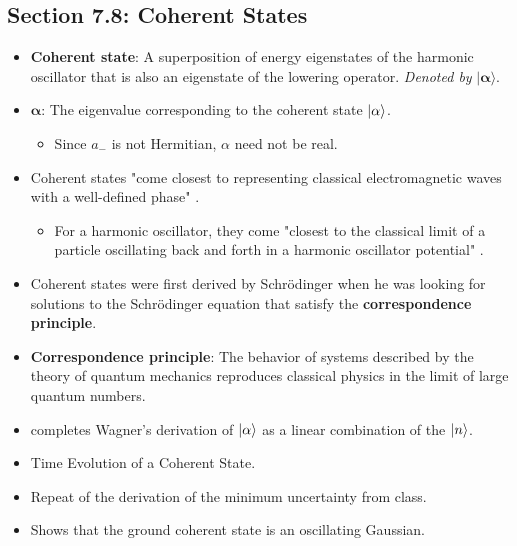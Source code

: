 \documentclass[../notes.tex]{subfiles}
\begin{document}
\subsection*{Section 7.8: Coherent States}
\begin{itemize}
    \item \textbf{Coherent state}: A superposition of energy eigenstates of the harmonic oscillator that is also an eigenstate of the lowering operator. \emph{Denoted by} $\bm{|\alpha\rangle}$.
    \item $\bm{\alpha}$: The eigenvalue corresponding to the coherent state $\ket{\alpha}$.
    \begin{itemize}
        \item Since $a_-$ is not Hermitian, $\alpha$ need not be real.
    \end{itemize}
    \item Coherent states "come closest to representing classical electromagnetic waves with a well-defined phase" \parencite[263]{bib:Townsend}.
    \begin{itemize}
        \item For a harmonic oscillator, they come "closest to the classical limit of a particle oscillating back and forth in a harmonic oscillator potential" \parencite[263]{bib:Townsend}.
    \end{itemize}
    \item Coherent states were first derived by Schr\"{o}dinger when he was looking for solutions to the Schr\"{o}dinger equation that satisfy the \textbf{correspondence principle}.
    \item \textbf{Correspondence principle}: The behavior of systems described by the theory of quantum mechanics reproduces classical physics in the limit of large quantum numbers.
    \item \textcite{bib:Townsend} completes Wagner's derivation of $\ket{\alpha}$ as a linear combination of the $\ket{n}$.
    \item Time Evolution of a Coherent State.
    \item Repeat of the derivation of the minimum uncertainty from class.
    \item Shows that the ground coherent state is an oscillating Gaussian.
\end{itemize}
\end{document}
